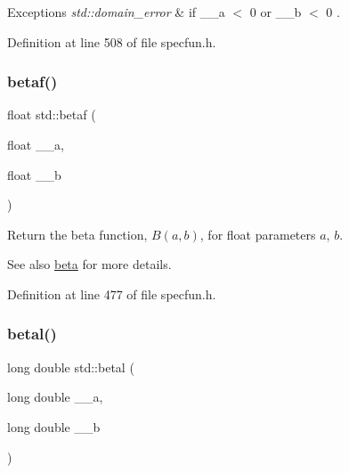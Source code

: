 \begin{DoxyExceptions}{Exceptions}
{\em std\+::domain\+\_\+error} & if {\ttfamily  \+\_\+\+\_\+a $<$ 0 } or {\ttfamily  \+\_\+\+\_\+b $<$ 0 }. \\
\hline
\end{DoxyExceptions}


Definition at line 508 of file specfun.\+h.

\mbox{\label{group__tr29124__math__spec__func_ga12dc61ee4c09172151cf092ed387e203}} 
\subsubsection{\texorpdfstring{betaf()}{betaf()}}
{\footnotesize\ttfamily float std\+::betaf (\begin{DoxyParamCaption}\item[{float}]{\+\_\+\+\_\+a,  }\item[{float}]{\+\_\+\+\_\+b }\end{DoxyParamCaption})\hspace{0.3cm}{\ttfamily [inline]}}

Return the beta function, $ B(a,b) $, for {\ttfamily float} parameters $ a $, $ b $.

\begin{DoxySeeAlso}{See also}
\hyperlink{group__tr29124__math__spec__func_gaffed6cf5d5e3daf3e2c3a936bc0a33e7}{beta} for more details. 
\end{DoxySeeAlso}


Definition at line 477 of file specfun.\+h.

\mbox{\label{group__tr29124__math__spec__func_ga8caca1cef099f41a88111209c36ce06c}} 
\subsubsection{\texorpdfstring{betal()}{betal()}}
{\footnotesize\ttfamily long double std\+::betal (\begin{DoxyParamCaption}\item[{long double}]{\+\_\+\+\_\+a,  }\item[{long double}]{\+\_\+\+\_\+b }\end{DoxyParamCaption})\hspace{0.3cm}{\ttfamily [inline]}}

